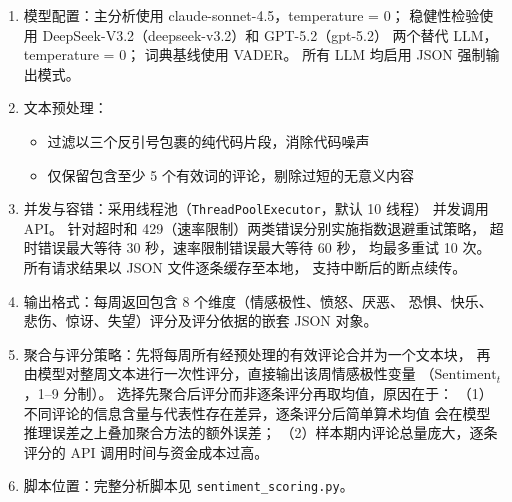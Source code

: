 \begin{enumerate}
  \item 模型配置：主分析使用 claude-sonnet-4.5，temperature = 0；
        稳健性检验使用 DeepSeek-V3.2（deepseek-v3.2）和 GPT-5.2（gpt-5.2）
        两个替代 LLM，temperature = 0；
        词典基线使用 VADER\cite{hutto2014vader}。
        所有 LLM 均启用 JSON 强制输出模式。
  \item 文本预处理：
    \begin{itemize}
      \item 过滤以三个反引号包裹的纯代码片段，消除代码噪声
      \item 仅保留包含至少 5 个有效词的评论，剔除过短的无意义内容
    \end{itemize}
  \item 并发与容错：采用线程池（\texttt{ThreadPoolExecutor}，默认 10 线程）
        并发调用 API。
        针对超时和 429（速率限制）两类错误分别实施指数退避重试策略，
        超时错误最大等待 30 秒，速率限制错误最大等待 60 秒，
        均最多重试 10 次。所有请求结果以 JSON 文件逐条缓存至本地，
        支持中断后的断点续传。
  \item 输出格式：每周返回包含 8 个维度（情感极性、愤怒、厌恶、
        恐惧、快乐、悲伤、惊讶、失望）评分及评分依据的嵌套 JSON 对象。
  \item 聚合与评分策略：先将每周所有经预处理的有效评论合并为一个文本块，
        再由模型对整周文本进行一次性评分，直接输出该周情感极性变量
        （$\text{Sentiment}_t$，1--9 分制）。
        选择先聚合后评分而非逐条评分再取均值，原因在于：
        （1）不同评论的信息含量与代表性存在差异，逐条评分后简单算术均值
        会在模型推理误差之上叠加聚合方法的额外误差；
        （2）样本期内评论总量庞大，逐条评分的 API 调用时间与资金成本过高。
  \item 脚本位置：完整分析脚本见 \texttt{sentiment\_scoring.py}。
\end{enumerate}
